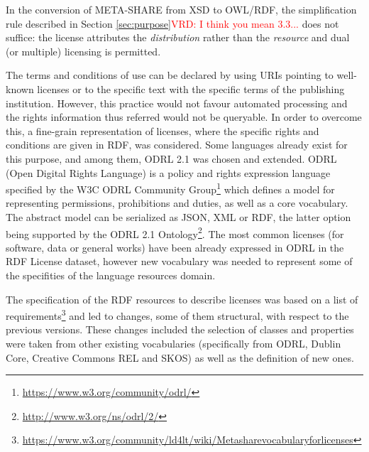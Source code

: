\documentclass{llncs}
\begin{document}
{In the conversion of META-SHARE from XSD to OWL/RDF, the simplification rule described in Section \ref{sec:purpose}\textcolor{red}{VRD: I think you mean 3.3...} does not suffice: the license attributes the \textit{distribution} rather than the \textit{resource} and dual (or multiple) licensing is permitted.

The terms and conditions of use can be declared by using URIs pointing to well-known licenses or to the specific text with the specific terms of the publishing institution. However, this practice would not favour automated processing and the rights information thus referred would not be queryable. In order to overcome this, a fine-grain representation of licenses, where the specific rights and conditions are given in RDF, was considered. Some languages already exist for this purpose, and among them, ODRL 2.1 was chosen and extended. ODRL (Open Digital Rights Language) is a policy and rights expression language specified by the W3C ODRL Community Group\footnote{\url{https://www.w3.org/community/odrl/}} which defines a model for representing permissions, prohibitions and duties, as well as a core vocabulary. The abstract model can be serialized as JSON, XML or RDF, the latter option being supported by the ODRL 2.1 Ontology\footnote{\url{http://www.w3.org/ns/odrl/2/}}. The most common licenses (for software, data or general works) have been already expressed in ODRL in the RDF License dataset\cite{rdflicense}, however new vocabulary was needed to represent some of the specifities of the language resources domain. 

The specification of the RDF resources to describe licenses was based on a list of requirements\footnote{\url{https://www.w3.org/community/ld4lt/wiki/Metasharevocabularyforlicenses}} and led to changes, some of them structural, with respect to the previous versions. 
These changes included the selection of classes and properties were taken from other existing vocabularies (specifically from ODRL, Dublin Core, Creative Commons REL and SKOS) as well as the definition of new ones. 

}
\end{document}

